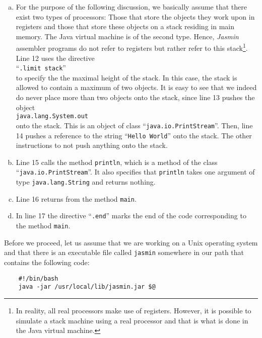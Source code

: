 \begin{enumerate}
\begin{enumerate}[(a)]
  \item For the purpose of the following discussion, we basically assume that there exist two types of
        processors: Those that store the objects they work upon in registers and those that store
        these objects on a stack residing in main memory.  The Java virtual machine is of the second
        type.  Hence, \textsl{Jasmin} assembler programs do not refer to registers but rather refer to
        this stack\footnote{
          In reality, all real processors make use of registers.  However, it is possible 
          to simulate a stack machine using a real processor and that is what is done in the Java
          virtual machine.}.
        Line 12 uses the directive
        \\[0.2cm]
        \hspace*{1.3cm}
        ``\texttt{.limit stack}''
        \\[0.2cm]
        to specify the the maximal height of the
        stack.  In this case, the stack is allowed to contain a maximum of two objects.  It is easy
        to see that we indeed do never place more than two objects onto the stack, since line
        13 pushes the object 
        \\[0.2cm]
        \hspace*{1.3cm}
        \texttt{java.lang.System.out}
        \\[0.2cm]
        onto the stack.  This is an object of class ``\texttt{java.io.PrintStream}''.
        Then, line 14 pushes a reference to the string ``\texttt{Hello World}'' onto the stack.
        The other instructions to not push anything onto the stack.
  \item Line 15 calls the method \texttt{println}, which is a method of the class
        ``\texttt{java.io.PrintStream}''.  It also specifies that \texttt{println} takes one argument of
        type \texttt{java.lang.String} and returns nothing.  
  \item Line 16 returns from the method \texttt{main}.
  \item In line 17 the directive ``\texttt{.end}''  marks the end of the code corresponding to the method 
        \texttt{main}.
  \end{enumerate}
\end{enumerate}
Before we proceed, let us assume that we are working on a Unix operating system and that there is an
executable file called \texttt{jasmin} somewhere in our path that contains the following code:
\begin{verbatim}
    #!/bin/bash 
    java -jar /usr/local/lib/jasmin.jar $@
\end{verbatim}
